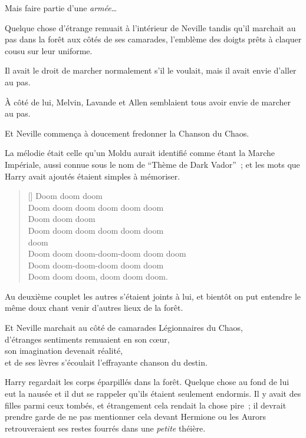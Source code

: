 Mais faire partie d'une \emph{armée}…

Quelque chose d'étrange remuait à l'intérieur de Neville tandis qu'il marchait au pas dans la forêt aux côtés de ses camarades, l'emblème des doigts prêts à claquer cousu sur leur uniforme.

Il avait le droit de marcher normalement s'il le voulait, mais il avait envie d'aller au pas.

À côté de lui, Melvin, Lavande et Allen semblaient tous avoir envie de marcher au pas.

Et Neville commença à doucement fredonner la Chanson du Chaos.

La mélodie était celle qu'un Moldu aurait identifié comme étant la Marche Impériale, aussi connue sous le nom de “Thème de Dark Vador”~; et les mots que Harry avait ajoutés étaient simples à mémoriser.
\baselineskip\settowidth{\versewidth}{Doom doom doom-doom-doom doom doom} \begin{verse}[\versewidth] Doom doom doom\\ Doom doom doom doom doom doom\\ Doom doom doom\\ Doom doom doom doom doom doom\\  doom \\ Doom doom doom-doom-doom doom doom\\ Doom doom-doom-doom doom doom\\ Doom doom doom, doom doom doom. \end{verse}\baselineskip

Au deuxième couplet les autres s'étaient joints à lui, et bientôt on put entendre le même doux chant venir d'autres lieux de la forêt.

Et Neville marchait au côté de camarades Légionnaires du Chaos,\\ d'étranges sentiments remuaient en son cœur,\\ son imagination devenait réalité,\\ et de ses lèvres s'écoulait l'effrayante chanson du destin.

\later

Harry regardait les corps éparpillés dans la forêt. Quelque chose au fond de lui eut la nausée et il dut se rappeler qu'ils étaient seulement endormis. Il y avait des filles parmi ceux tombés, et étrangement cela rendait la chose pire~; il devrait prendre garde de ne pas mentionner cela devant Hermione ou les Aurors retrouveraient ses restes fourrés dans une \emph{petite} théière.

